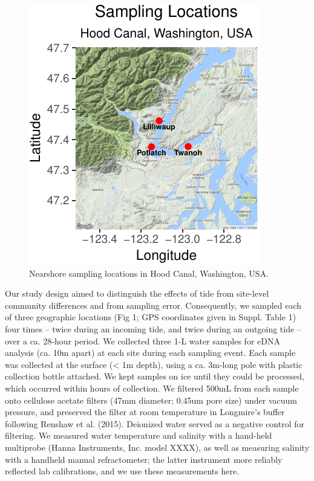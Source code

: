 \documentclass[fleqn,10pt,lineno]{wlpeerj} %
\begin{document}
\begin{figure}

{\centering \includegraphics{figures/FIG1_sitemap-1} 

}

\caption{\label{fig:fig1}Nearshore sampling locations in Hood Canal, Washington, USA.}\label{fig:FIG1_sitemap}
\end{figure}

Our study design aimed to distinguish the effects of tide from
site-level community differences and from sampling error. Consequently,
we sampled each of three geographic locations (Fig 1; GPS coordinates
given in Suppl. Table 1) four times -- twice during an incoming tide,
and twice during an outgoing tide -- over a ca. 28-hour period. We
collected three 1-L water samples for eDNA analysis (ca. 10m apart) at
each site during each sampling event. Each sample was collected at the
surface (\textless{} 1m depth), using a ca. 3m-long pole with plastic
collection bottle attached. We kept samples on ice until they could be
processed, which occurred within hours of collection. We filtered 500mL
from each sample onto cellulose acetate filters (47mm diameter; 0.45um
pore size) under vacuum pressure, and preserved the filter at room
temperature in Longmire's buffer following Renshaw et al. (2015).
Deionized water served as a negative control for filtering. We measured
water temperature and salinity with a hand-held multiprobe (Hanna
Instruments, Inc. model XXXX), as well as measuring salinity with a
handheld manual refractometer; the latter instrument more reliably
reflected lab calibrations, and we use these measurements here.
\end{document}
